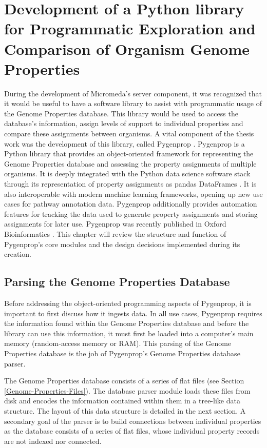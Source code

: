 \chapter{Development of a Python library for Programmatic Exploration and Comparison of Organism Genome Properties} \label{Pygenprop}

During the development of Micromeda's server component, it was recognized that it would be useful to have a software library to assist with programmatic usage of the Genome Properties database. This library would be used to access the database's information, assign levels of support to individual properties and compare these assignments between organisms. A vital component of the thesis work was the development of this library, called Pygenprop \cite{bergstrand2019pygenprop}. Pygenprop is a Python library that provides an object-oriented framework \cite{booch1986object} for representing the Genome Properties database and assessing the property assignments of multiple organisms. It is deeply integrated with the Python data science software stack \cite{scipystack} through its representation of property assignments as pandas DataFrames \cite{mckinney2010data}. It is also interoperable with modern machine learning frameworks, opening up new use cases for pathway annotation data. Pygenprop additionally provides automation features for tracking the data used to generate property assignments and storing assignments for later use. Pygenprop was recently published in Oxford Bioinformatics \cite{bergstrand2019pygenprop}. This chapter will review the structure and function of Pygenprop's core modules and the design decisions implemented during its creation.

\section{Parsing the Genome Properties Database} \label{genome-properties-parser}

Before addressing the object-oriented programming aspects of Pygenprop, it is important to first discuss how it ingests data. In all use cases, Pygenprop requires the information found within the Genome Properties database and before the library can use this information, it must first be loaded into a computer's main memory (random-access memory or RAM). This parsing of the Genome Properties database is the job of Pygenprop's Genome Properties database parser.

The Genome Properties database consists of a series of flat files (see Section \ref{Genome-Properties-Files}). The database parser module loads these files from disk and encodes the information contained within them in a tree-like data structure. The layout of this data structure is detailed in the next section. A secondary goal of the parser is to build connections between individual properties as the database consists of a series of flat files, whose individual property records are not indexed nor connected. 

